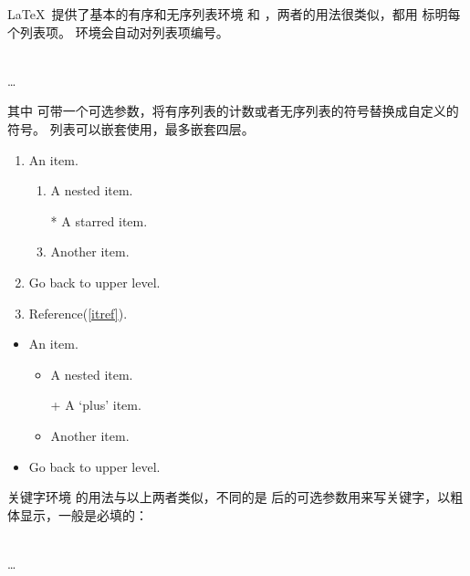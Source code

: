 \LaTeX\ 提供了基本的有序和无序列表环境  和 ，两者的用法很类似，都用  标明每个列表项。
 环境会自动对列表项编号。
\begin{command}
 \\
 \ldots \\
\end{command}

其中  可带一个可选参数，将有序列表的计数或者无序列表的符号替换成自定义的符号。
列表可以嵌套使用，最多嵌套四层。
\begin{example}
\begin{enumerate}
  \item An item. 
  \begin{enumerate}
    \item A nested item.
    \item[*] A starred item.
    \item Another item. \label{itref}
  \end{enumerate}
  \item Go back to upper level.
  \item Reference(\ref{itref}).
\end{enumerate}
\end{example}

\begin{example}
\begin{itemize}
  \item An item.
  \begin{itemize}
    \item A nested item.
    \item[+] A `plus' item.
    \item Another item.
  \end{itemize}
  \item Go back to upper level.
\end{itemize}
\end{example}

关键字环境  的用法与以上两者类似，不同的是  后的可选参数用来写关键字，以粗体显示，一般是必填的：
\begin{command}
 \\
   \ldots \\
\end{command}

